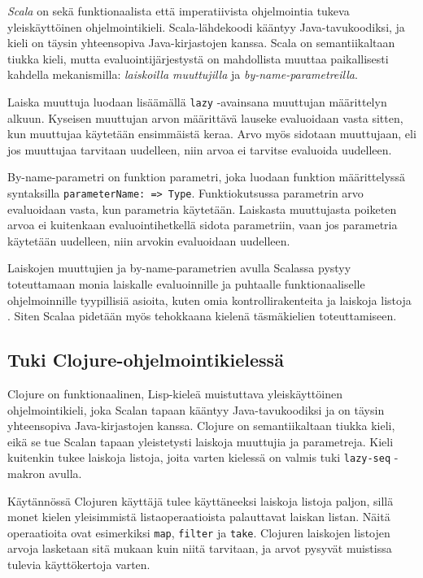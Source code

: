 \textit{Scala} on sekä funktionaalista että imperatiivista ohjelmointia tukeva yleiskäyttöinen ohjelmointikieli. Scala-lähdekoodi kääntyy Java-tavukoodiksi, ja kieli on täysin yhteensopiva Java-kirjastojen kanssa. Scala on semantiikaltaan tiukka kieli, mutta evaluointijärjestystä on mahdollista muuttaa paikallisesti kahdella mekanismilla: \textit{laiskoilla muuttujilla} ja \textit{by-name-parametreilla}.

Laiska muuttuja luodaan lisäämällä \verb!lazy! -avainsana muuttujan määrittelyn alkuun. Kyseisen muuttujan arvon määrittävä lauseke evaluoidaan vasta sitten, kun muuttujaa käytetään ensimmäistä keraa. Arvo myös sidotaan muuttujaan, eli jos muuttujaa tarvitaan uudelleen, niin arvoa ei tarvitse evaluoida uudelleen.

By-name-parametri on funktion parametri, joka luodaan funktion määrittelyssä syntaksilla \verb!parameterName: => Type!. Funktiokutsussa parametrin arvo evaluoidaan vasta, kun parametria käytetään. Laiskasta muuttujasta poiketen arvoa ei kuitenkaan evaluointihetkellä sidota parametriin, vaan jos parametria käytetään uudelleen, niin arvokin evaluoidaan uudelleen.

Laiskojen muuttujien ja by-name-parametrien avulla Scalassa pystyy toteuttamaan monia laiskalle evaluoinnille ja puhtaalle funktionaaliselle ohjelmoinnille tyypillisiä asioita, kuten omia kontrollirakenteita ja laiskoja listoja \citet{chiusano2014functional}. Siten Scalaa pidetään myös tehokkaana kielenä täsmäkielien toteuttamiseen.

\subsection{Tuki Clojure-ohjelmointikielessä}

Clojure on funktionaalinen, Lisp-kieleä muistuttava yleiskäyttöinen ohjelmointikieli, joka Scalan tapaan kääntyy Java-tavukoodiksi ja on täysin yhteensopiva Java-kirjastojen kanssa. Clojure on semantiikaltaan tiukka kieli, eikä se tue Scalan tapaan yleistetysti laiskoja muuttujia ja parametreja. Kieli kuitenkin tukee laiskoja listoja, joita varten kielessä on valmis tuki \verb!lazy-seq! -makron avulla.

Käytännössä Clojuren käyttäjä tulee käyttäneeksi laiskoja listoja paljon, sillä monet kielen yleisimmistä listaoperaatioista palauttavat laiskan listan. Näitä operaatioita ovat esimerkiksi \verb!map!, \verb!filter! ja \verb!take!. Clojuren laiskojen listojen arvoja lasketaan sitä mukaan kuin niitä tarvitaan, ja arvot pysyvät muistissa tulevia käyttökertoja varten.

